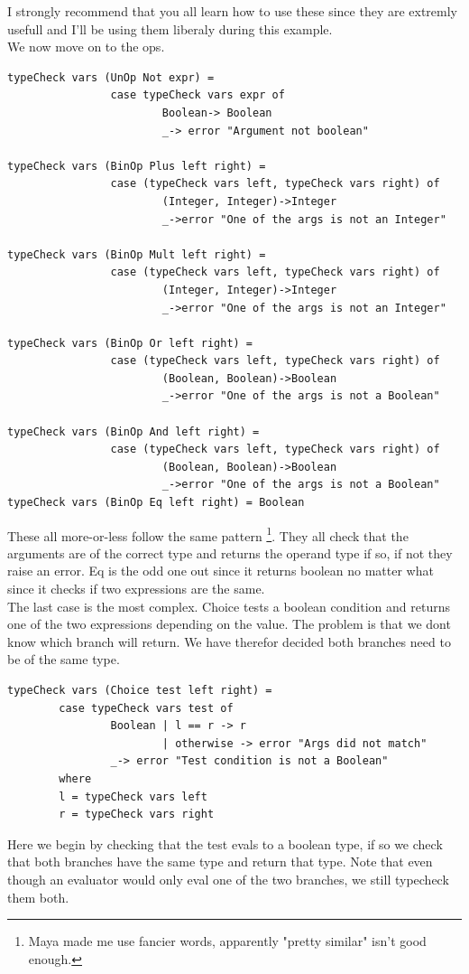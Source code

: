\documentclass{article}
\begin{document}
            I strongly recommend that you all learn how to use these since they are extremly usefull and I'll be using them liberaly during this example.\\
            We now move on to the ops. 
            \begin{lstlisting}
typeCheck vars (UnOp Not expr) = 
                case typeCheck vars expr of
                        Boolean-> Boolean 
                        _-> error "Argument not boolean"

typeCheck vars (BinOp Plus left right) = 
                case (typeCheck vars left, typeCheck vars right) of
                        (Integer, Integer)->Integer
                        _->error "One of the args is not an Integer"

typeCheck vars (BinOp Mult left right) = 
                case (typeCheck vars left, typeCheck vars right) of
                        (Integer, Integer)->Integer
                        _->error "One of the args is not an Integer"

typeCheck vars (BinOp Or left right) = 
                case (typeCheck vars left, typeCheck vars right) of
                        (Boolean, Boolean)->Boolean
                        _->error "One of the args is not a Boolean"

typeCheck vars (BinOp And left right) = 
                case (typeCheck vars left, typeCheck vars right) of
                        (Boolean, Boolean)->Boolean
                        _->error "One of the args is not a Boolean"
typeCheck vars (BinOp Eq left right) = Boolean
            \end{lstlisting}
            These all more-or-less follow the same pattern \footnote{Maya made me use fancier words, apparently "pretty similar" isn't good enough.}.
            They all check that the arguments are of the correct type and returns the operand type if so, if not they raise an error.
            Eq is the odd one out since it returns boolean no matter what since it checks if two expressions are the same.\\
            The last case is the most complex. Choice tests a boolean condition and returns one of the two expressions depending on the value.
            The problem is that we dont know which branch will return. We have therefor decided both branches need to be of the same type.
            \begin{lstlisting}
typeCheck vars (Choice test left right) = 
        case typeCheck vars test of
                Boolean | l == r -> r
                        | otherwise -> error "Args did not match"
                _-> error "Test condition is not a Boolean"
        where 
        l = typeCheck vars left
        r = typeCheck vars right
            \end{lstlisting}
            Here we begin by checking that the test evals to a boolean type, if so we check that both branches have the same type and return that type.
            Note that even though an evaluator would only eval one of the two branches, we still typecheck them both.
\end{document}
